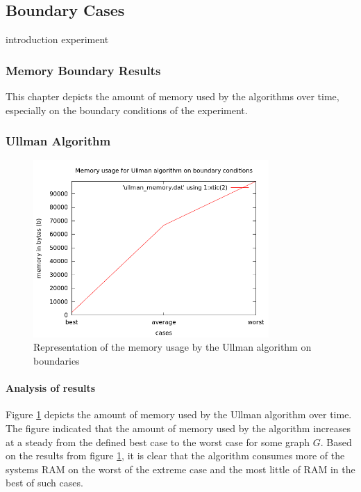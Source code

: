 \subsection{Boundary Cases}
\label{Boundary Cases}

{introduction}
{experiment}

\subsubsection{Memory Boundary Results}
\label{Memory Boundary Results}
This chapter depicts the amount of memory used by the algorithms over time, especially on the boundary conditions of the experiment.

\subsubsection{Ullman Algorithm}
\begin{figure}[H]
  \begin{center}
      \includegraphics[width=0.8\textwidth]{ullman_memory.png}
  \end{center}    
  \caption{Representation of the memory usage by the Ullman algorithm on boundaries}
  \label{fig:case_ullman_memory}
\end{figure} 

\paragraph{Analysis of results}
Figure \ref{fig:case_ullman_memory} depicts the amount of memory used by the Ullman algorithm over time. The figure indicated that the amount of memory used
by the algorithm increases at a steady from the defined best case to the worst case for some graph $G$.\newline\newline
Based on the results from figure \ref{fig:case_ullman_memory}, it is clear that the algorithm consumes more of the systems RAM on the worst of the extreme case
and the most little of RAM in the best of such cases.

